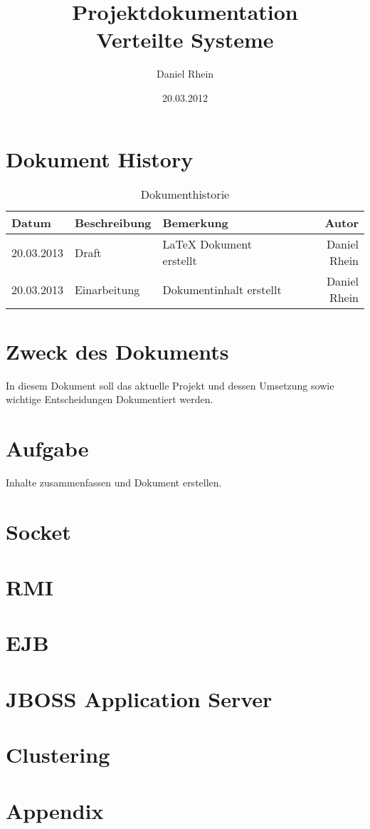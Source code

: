 \documentclass[a4paper,final,12pt]{scrreprt}
\title{Projektdokumentation\\Verteilte Systeme}
\author{Daniel Rhein}
\date{20.03.2012}
\begin{document}
 \pagestyle{empty}
\maketitle

\pagestyle{fancy}
\cfoot{}
\tableofcontents
\setcounter{chapter}{1}
\newpage
\section{Dokument History}
	\begin{table}[h]
	\begin{tabular}{|l|l|l|r|}\hline
	Datum & Beschreibung & Bemerkung & Autor \\\hline
	20.03.2013 & Draft & \LaTeX{} Dokument erstellt & Daniel Rhein \\\hline
	20.03.2013 & Einarbeitung & Dokumentinhalt erstellt	 & Daniel Rhein \\\hline
	\end{tabular}
	\caption[Dokumenthistorie]{Dokumenthistorie}  
	\end{table}

\section{Zweck des Dokuments}
In diesem Dokument soll das aktuelle Projekt und dessen Umsetzung sowie wichtige Entscheidungen Dokumentiert werden.
\section{Aufgabe}
Inhalte zusammenfassen und Dokument erstellen.
\section{Socket}
\section{RMI}
\section{EJB}
\section{JBOSS Application Server}
\section{Clustering}

\listoffigures
\listoftables

 
\section{Appendix }
\end{document}
